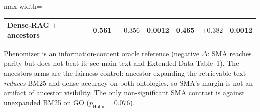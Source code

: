 \documentclass[pdflatex,sn-nature]{sn-jnl}
\begin{document}
\begin{appendices}
\begin{table}[htbp]
\begin{adjustbox}{max width=\textwidth}
\begin{tabular}{lcccccc}
Dense-RAG $+$ ancestors    & 0.561 & $+0.356$ & 0.0012  & 0.465 & $+0.382$ & 0.0012  \\
\bottomrule
\end{tabular}\end{adjustbox}
\begin{flushleft}
{\footnotesize
Phenomizer is an information-content oracle reference (negative $\Delta$:
SMA reaches parity but does not beat it; see main text and
Extended Data Table~1). The $+$ancestors arms are the fairness
control: ancestor-expanding the retrievable text \emph{reduces} BM25 and dense
accuracy on both ontologies, so SMA's margin is not an artifact of ancestor
visibility. The only non-significant SMA contrast is against unexpanded BM25 on
GO ($p_{\mathrm{Holm}}{=}0.076$).}
\end{flushleft}
\label{tab:ed4_fair_baselines}
\end{table}




\end{appendices}
\end{document}
